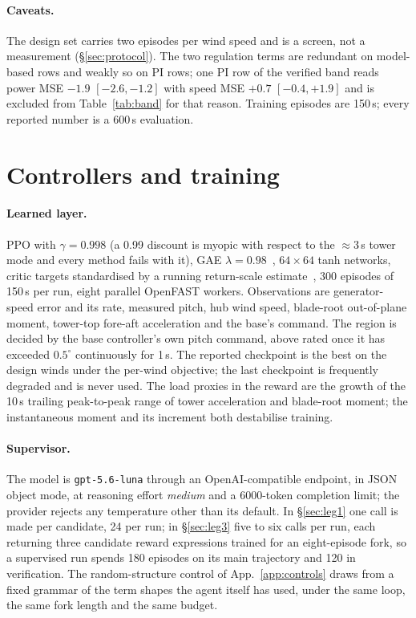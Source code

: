 \documentclass{article}
\begin{document}
\paragraph{Caveats.} The design set carries two episodes per wind speed and is a screen, not a measurement (§\ref{sec:protocol}). The two regulation terms are redundant on model-based rows and weakly so on PI rows; one PI row of the verified band reads power MSE $-1.9$ $[-2.6, -1.2]$ with speed MSE $+0.7$ $[-0.4, +1.9]$ and is excluded from Table~\ref{tab:band} for that reason. Training episodes are 150\,s; every reported number is a 600\,s evaluation.

\section{Controllers and training}
\label{app:controllers}
\paragraph{Learned layer.} PPO with $\gamma=0.998$ (a 0.99 discount is myopic with respect to the $\approx3$\,s tower mode and every method fails with it), GAE $\lambda=0.98$~\citep{Schulman2016gae}, $64\times64$ tanh networks, critic targets standardised by a running return-scale estimate~\citep{vanHasselt2016popart}, 300 episodes of 150\,s per run, eight parallel OpenFAST workers. Observations are generator-speed error and its rate, measured pitch, hub wind speed, blade-root out-of-plane moment, tower-top fore-aft acceleration and the base's command. The region is decided by the base controller's own pitch command, above rated once it has exceeded $0.5^\circ$ continuously for 1\,s. The reported checkpoint is the best on the design winds under the per-wind objective; the last checkpoint is frequently degraded and is never used. The load proxies in the reward are the growth of the 10\,s trailing peak-to-peak range of tower acceleration and blade-root moment; the instantaneous moment and its increment both destabilise training.

\paragraph{Supervisor.} The model is \texttt{gpt-5.6-luna} through an OpenAI-compatible endpoint, in JSON object mode, at reasoning effort \emph{medium} and a 6000-token completion limit; the provider rejects any temperature other than its default. In §\ref{sec:leg1} one call is made per candidate, 24 per run; in §\ref{sec:leg3} five to six calls per run, each returning three candidate reward expressions trained for an eight-episode fork, so a supervised run spends 180 episodes on its main trajectory and 120 in verification. The random-structure control of App.~\ref{app:controls} draws from a fixed grammar of the term shapes the agent itself has used, under the same loop, the same fork length and the same budget.
\end{document}
